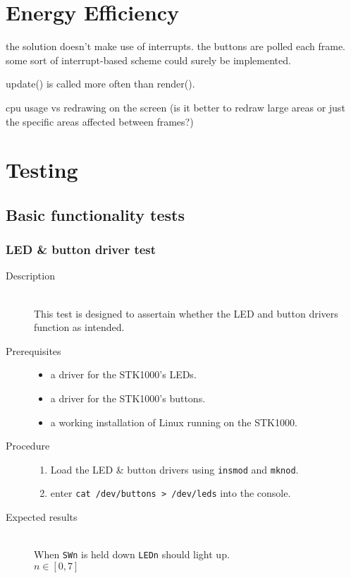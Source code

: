 \section{Energy Efficiency}
	the solution doesn't make use of interrupts.
	the buttons are polled each frame. some sort of interrupt-based scheme could surely be implemented.

	update() is called more often than render().

	cpu usage vs redrawing on the screen (is it better to redraw large areas or just the specific areas affected between frames?)

\section{Testing}
\subsection{Basic functionality tests}
	\subsubsection{LED \& button driver test}
		\begin{description}
			\item[Description] \hfill \\
				This test is designed to assertain whether the LED and button drivers function as intended.
			\item[Prerequisites] \hfill
				\begin{itemize}
					\item{a driver for the STK1000's LEDs.}
					\item{a driver for the STK1000's buttons.}
					\item{a working installation of Linux running on the STK1000.}
				\end{itemize}
			\item[Procedure] \hfill
				\begin{enumerate}
					\item{Load the LED \& button drivers using \texttt{insmod} and \texttt{mknod}.}
					\item{enter \texttt{cat /dev/buttons > /dev/leds} into the console.}
				\end{enumerate}
			\item[Expected results] \hfill \\
				When \texttt{SWn} is held down \texttt{LEDn} should light up.
				\\$n \in [0,7]$
		\end{description}	


